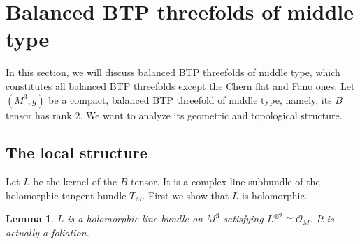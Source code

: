 \documentclass{amsart}
\numberwithin{equation}{section}
\newtheorem{lemma}  [theorem]     {Lemma}
\theoremstyle{definition}
\renewcommand{\1}{\mathds{1}}
\renewcommand{\>}{\rightarrow}
\begin{document}
\vspace{0.4cm}

\section{Balanced BTP threefolds of middle type}\label{mddtype3D}

In this section, we will discuss balanced BTP threefolds of middle type, which constitutes all balanced BTP threefolds except the Chern flat and Fano ones. Let $(M^3,g)$ be a compact, balanced BTP threefold of middle type, namely, its $B$ tensor has rank $2$. We want to analyze its geometric and topological structure.

\subsection{The local structure}\label{str}

Let $L$ be the kernel of the $B$ tensor. It is a complex line subbundle of the holomorphic tangent bundle $T_{\!M}$. First we show that $L$ is holomorphic.

\begin{lemma} \label{claim9.1}
$L$ is a holomorphic line bundle on $M^3$ satisfying $L^{\otimes 2}\cong {\mathcal O}_{\!M}$. It is actually a foliation.
\end{lemma}
\end{document}
